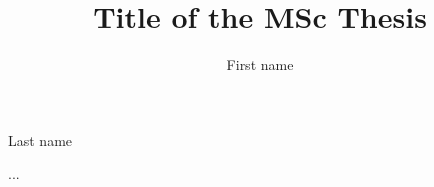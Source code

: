 \documentclass[a4paper]{thesis}
\begin{document}
\title[Subtitle]{Title of the MSc Thesis}
\author{First name}{Last name}

\frontmatter



\tableofcontents

\mainmatter
\thumbtrue


...

\printbibliography[
heading=bibintoc,
title={Bibliography}
]

\appendix

\end{document}
